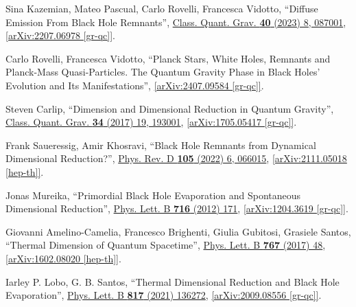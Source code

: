 \documentclass[preprintnumbers, floatfix, preprintnumbers, letterpaper, twocolumn, superscriptaddress,nofootinbib]{revtex4-2}
\begin{document}
\begin{thebibliography}{99}
Sina Kazemian, Mateo Pascual, Carlo Rovelli, Francesca Vidotto, ``Diffuse Emission From Black Hole Remnants'', {\hypersetup{urlcolor=vividviolet}\href{https://iopscience.iop.org/article/10.1088/1361-6382/acc232}{Class. Quant. Grav. \textbf{40} (2023) 8, 087001}}, \href{https://arxiv.org/abs/2207.06978}{[arXiv:2207.06978 [gr-qc]]}.

Carlo Rovelli, Francesca Vidotto, ``Planck Stars, White Holes, Remnants and Planck-Mass Quasi-Particles. The Quantum Gravity Phase in Black Holes’ Evolution and Its Manifestations'', \href{https://arxiv.org/abs/2407.09584}{[arXiv:2407.09584 [gr-qc]]}.


Steven Carlip, ``Dimension and Dimensional Reduction in Quantum Gravity'', {\hypersetup{urlcolor=vividviolet}\href{https://iopscience.iop.org/article/10.1088/1361-6382/aa8535}{Class. Quant. Grav. \textbf{34} (2017) 19, 193001}}, \href{https://arxiv.org/abs/1705.05417}{[arXiv:1705.05417 [gr-qc]]}.

Frank Saueressig, Amir Khosravi, ``Black Hole Remnants from Dynamical Dimensional Reduction?'', {\hypersetup{urlcolor=vividviolet}\href{https://journals.aps.org/prd/abstract/10.1103/PhysRevD.105.066015}{Phys. Rev. D \textbf{105} (2022) 6, 066015}}, \href{https://arxiv.org/abs/2111.05018}{[arXiv:2111.05018 [hep-th]]}.


Jonas Mureika, ``Primordial Black Hole Evaporation and Spontaneous Dimensional Reduction'', {\hypersetup{urlcolor=vividviolet}\href{https://www.sciencedirect.com/science/article/pii/S0370269312008660?via\%3Dihub}{Phys. Lett. B \textbf{716} (2012) 171}}, \href{https://arxiv.org/abs/1204.3619}{[arXiv:1204.3619 [gr-qc]]}.

Giovanni Amelino-Camelia, Francesco Brighenti, Giulia Gubitosi, Grasiele Santos, ``Thermal Dimension of Quantum Spacetime'',  {\hypersetup{urlcolor=vividviolet}\href{https://www.sciencedirect.com/science/article/pii/S0370269317300680?via\%3Dihub}{Phys. Lett. B \textbf{767} (2017) 48}}, \href{https://arxiv.org/abs/1602.08020}{[arXiv:1602.08020 [hep-th]]}.

Iarley  P. Lobo, G. B. Santos, ``Thermal Dimensional Reduction and Black Hole Evaporation'', {\hypersetup{urlcolor=vividviolet}\href{https://linkinghub.elsevier.com/retrieve/pii/S0370269321002124}{Phys. Lett. B \textbf{817} (2021) 136272}}, \href{https://arxiv.org/abs/2009.08556}{[arXiv:2009.08556 [gr-qc]]}.


\end{thebibliography}
\end{document}
